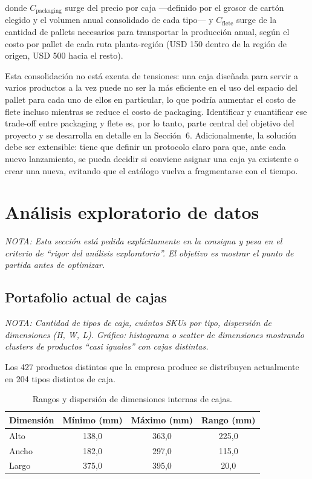 \documentclass[11pt]{article}
\newcommand{\nota}[1]{{\itshape\color{notegray}\small NOTA: #1}\par\vspace{2pt}}
\begin{document}
donde $C_{\text{packaging}}$ surge del precio por caja ---definido por el grosor de cartón
elegido y el volumen anual consolidado de cada tipo--- y $C_{\text{flete}}$ surge de la
cantidad de pallets necesarios para transportar la producción anual, según el costo por
pallet de cada ruta planta-región (USD 150 dentro de la región de origen, USD 500 hacia el
resto).

Esta consolidación no está exenta de tensiones: una caja diseñada para servir a varios
productos a la vez puede no ser la más eficiente en el uso del espacio del pallet para
cada uno de ellos en particular, lo que podría aumentar el costo de flete incluso mientras
se reduce el costo de packaging. Identificar y cuantificar ese trade-off entre packaging y
flete es, por lo tanto, parte central del objetivo del proyecto y se desarrolla en detalle
en la Sección~6. Adicionalmente, la solución debe ser extensible: tiene que definir un
protocolo claro para que, ante cada nuevo lanzamiento, se pueda decidir si conviene
asignar una caja ya existente o crear una nueva, evitando que el catálogo vuelva a
fragmentarse con el tiempo.

\section{Análisis exploratorio de datos}
\nota{Esta sección está pedida explícitamente en la consigna y pesa en el criterio de ``rigor del análisis exploratorio''. El objetivo es mostrar el punto de partida antes de optimizar.}

\subsection{Portafolio actual de cajas}
\nota{Cantidad de tipos de caja, cuántos SKUs por tipo, dispersión de dimensiones (H, W, L). Gráfico: histograma o scatter de dimensiones mostrando clusters de productos ``casi iguales'' con cajas distintas.}

Los 427 productos distintos que la empresa produce se distribuyen actualmente en 204 tipos distintos de caja.

\begin{table}[htbp]
  \centering
  \caption{Rangos y dispersión de dimensiones internas de cajas.}
  \label{tab:dimensiones_internas}
  \begin{tabular}{l c c c}
    \toprule
    \textbf{Dimensión} & \textbf{Mínimo (mm)} & \textbf{Máximo (mm)} & \textbf{Rango (mm)} \\
    \midrule
    Alto  & 138,0 & 363,0 & 225,0 \\
    Ancho & 182,0 & 297,0 & 115,0 \\
    Largo & 375,0 & 395,0 &  20,0 \\
    \bottomrule
  \end{tabular}
\end{table}
\end{document}
